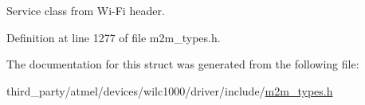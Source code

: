 Service class from Wi-\/\+Fi header. 

Definition at line 1277 of file m2m\+\_\+types.\+h.



The documentation for this struct was generated from the following file\+:\begin{DoxyCompactItemize}
\item 
third\+\_\+party/atmel/devices/wilc1000/driver/include/\hyperlink{m2m__types_8h}{m2m\+\_\+types.\+h}\end{DoxyCompactItemize}
